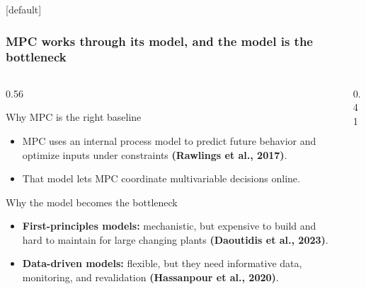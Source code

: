 \documentclass[aspectratio=169]{beamer}
\begin{document}
\begin{frame}
[default]
\frametitle{\large \textbf{MPC works through its model, and the model is the bottleneck}}
\scriptsize

\vspace{-0.28cm}

\begin{columns}[T,onlytextwidth]

\begin{column}{0.56\textwidth}

\begin{block}{Why MPC is the right baseline}
\begin{itemize}\justifying
  \setlength\itemsep{0.35ex}

  \item MPC uses an internal process model to predict future behavior and optimize inputs under constraints
  {\bf \color{maroon1} \scriptsize (Rawlings et al., 2017)}.

  \item That model lets MPC coordinate multivariable decisions online.
\end{itemize}
\end{block}

\vspace{0.02cm}

\begin{block}{Why the model becomes the bottleneck}
\begin{itemize}\justifying
  \setlength\itemsep{0.35ex}

  \item \textbf{First-principles models:} mechanistic, but expensive to build and hard to maintain for large changing plants
  {\bf \color{maroon1} \scriptsize (Daoutidis et al., 2023)}.

  \item \textbf{Data-driven models:} flexible, but they need informative data, monitoring, and revalidation
  {\bf \color{maroon1} \scriptsize (Hassanpour et al., 2020)}.
\end{itemize}
\end{block}

\end{column}

\begin{column}{0.41\textwidth}
\centering

\vspace{0.5cm}


\end{column}
\end{columns}
\end{frame}
\end{document}
